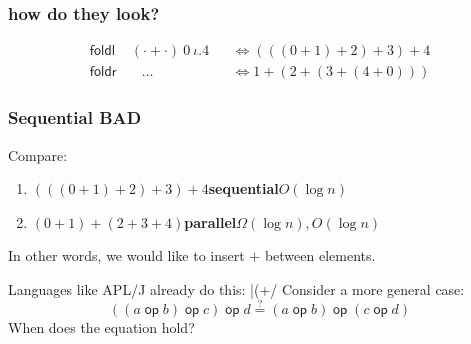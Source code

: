 \documentclass{beamer}
\DeclareMathOperator{\op}{\mathsf{op}}
\begin{document}
\begin{frame}
    \frametitle{how do they look?}
    \begin{align*}
        \mathsf{foldl} & \ (\cdot + \cdot)\ 0\ \iota.4 &  & \iff (((0 + 1) + 2) + 3) + 4 \\
        \mathsf{foldr} & \quad \ldots                  &  & \iff 1 + (2 + (3 + (4 + 0)))
    \end{align*}
    \begin{figure}[h]
        \hspace{3cm}
    \end{figure}
\end{frame}
\begin{frame}[fragile]
    \frametitle{Sequential BAD}
    Compare:
    \begin{enumerate}
        \item $(((0 + 1) + 2) + 3) + 4$\hspace{1cm}\textbf{sequential}\hfill $O(\log n)$
        \item $(0 + 1) + (2 + 3 + 4)$\hphantom{()}\hspace{1cm}\textbf{parallel}\hfill $\Omega(\log n), O(\log n)$
    \end{enumerate}
    In other words, we would like to insert $+$ between elements.

    Languages like APL/J already do this:
    |(+/ %
    Consider a more general case:
    \begin{equation*}
        ((a \op b) \op c) \op d \overset{?}{=} (a \op b) \op (c \op d)
    \end{equation*}
    When does the equation hold?
\end{frame}
\end{document}
